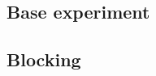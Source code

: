 \documentclass{article}
\newcommand{\glnote}[1]{\textcolor{red}{[GL: #1]}}
\newcommand{\msnote}[1]{\textcolor{blue}{[MS: #1]}}
\begin{document}

\subsection{Base experiment}




\subsection{Blocking}


\end{document}
